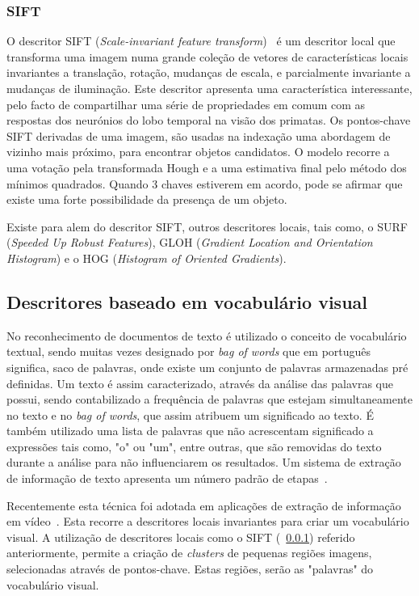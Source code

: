 \subsubsection{SIFT} \label{subsubsec:sift}

O descritor SIFT (\textit{Scale-invariant feature transform})~\cite{Lowe1999} é um descritor local que transforma uma imagem numa grande coleção de vetores de características locais invariantes a translação, rotação, mudanças de escala, e parcialmente invariante a mudanças de iluminação. Este descritor apresenta uma característica interessante, pelo facto de compartilhar uma série de propriedades em comum com as respostas dos neurónios do lobo temporal na visão dos primatas. Os pontos-chave SIFT derivadas de uma imagem, são usadas na indexação uma abordagem de vizinho mais próximo, para encontrar objetos candidatos. O modelo recorre a uma votação pela transformada Hough e a uma estimativa final pelo método dos mínimos quadrados. Quando 3 chaves estiverem em acordo, pode se afirmar que existe uma forte possibilidade da presença de um objeto.   

Existe para alem do descritor SIFT, outros descritores locais, tais como, o SURF (\textit{Speeded Up Robust Features}), GLOH (\textit{Gradient Location and Orientation Histogram}) e o HOG (\textit{Histogram of Oriented Gradients}).

\subsection{Descritores baseado em vocabulário visual}

No reconhecimento de documentos de texto é utilizado o conceito de vocabulário textual, sendo muitas vezes designado por \textit{bag of words} que em português significa, saco de palavras, onde existe um conjunto de palavras armazenadas pré definidas. Um texto é assim caracterizado, através da análise das palavras que possui, sendo contabilizado a frequência de palavras que estejam simultaneamente no texto e no \textit{bag of words}, que assim atribuem um significado ao texto. É também utilizado uma lista de palavras que não acrescentam significado a expressões tais como, "o" ou "um", entre outras, que são removidas do texto durante a análise para não influenciarem os resultados. Um sistema de extração de informação de texto apresenta um número padrão de etapas~\cite{Baeza-Yates1999}. 

Recentemente esta técnica foi adotada em aplicações de extração de informação em vídeo~\cite{Sivic2003, Sivic2006}. Esta recorre a descritores locais invariantes para criar um vocabulário visual. A utilização de descritores locais como o SIFT (~\ref{subsubsec:sift}) referido anteriormente, permite a criação de \textit{clusters} de pequenas regiões imagens, selecionadas através de pontos-chave. Estas regiões, serão as "palavras" do vocabulário visual.

